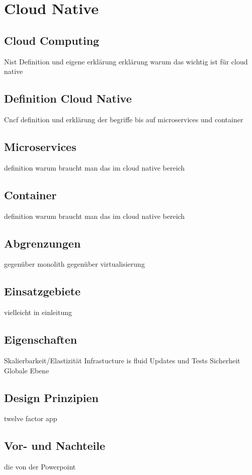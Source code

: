 \chapter{Cloud Native}

\section{Cloud Computing}
Nist Definition und eigene erklärung
erklärung warum das wichtig ist für cloud native
\section{Definition Cloud Native}
Cncf definition und erklärung der begriffe bis auf microservices und container
\section{Microservices}
definition
warum braucht man das im cloud native bereich
\section{Container}
definition
warum braucht man das im cloud native bereich
\section{Abgrenzungen}
gegenüber monolith
gegenüber virtualisierung
\section{Einsatzgebiete}
vielleicht in einleitung
\section{Eigenschaften}
Skalierbarkeit/Elastizität
Infrastucture is fluid
Updates und Tests
Sicherheit
Globale Ebene
\section{Design Prinzipien}
twelve factor app
\section{Vor- und Nachteile}
die von der Powerpoint